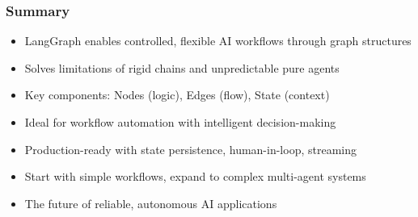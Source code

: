 \begin{frame}[fragile]\frametitle{Summary}
      \begin{itemize}
        \item LangGraph enables controlled, flexible AI workflows through graph structures
        \item Solves limitations of rigid chains and unpredictable pure agents
        \item Key components: Nodes (logic), Edges (flow), State (context)
        \item Ideal for workflow automation with intelligent decision-making
        \item Production-ready with state persistence, human-in-loop, streaming
        \item Start with simple workflows, expand to complex multi-agent systems
        \item The future of reliable, autonomous AI applications
      \end{itemize}
\end{frame}